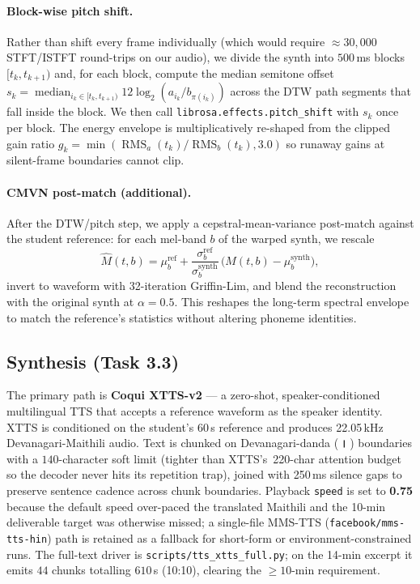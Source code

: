 \documentclass[conference]{IEEEtran}
\newcommand{\hin}[1]{{\hindifont #1}}
\begin{document}
\paragraph*{Block-wise pitch shift.} Rather than shift every frame
individually (which would require $\approx 30{,}000$ STFT/ISTFT
round-trips on our audio), we divide the synth into $500$\,ms blocks
$[t_k, t_{k+1})$ and, for each block, compute the median semitone
offset $s_k = \operatorname{median}_{i_k \in [t_k,t_{k+1})} 12\log_{2}(a_{i_k}/b_{\pi(i_k)})$
across the DTW path segments that fall inside the block. We then call
\texttt{librosa.effects.pitch\_shift} with $s_k$ once per block. The
energy envelope is multiplicatively re-shaped from the clipped gain
ratio $g_k = \min(\operatorname{RMS}_a(t_k)/\operatorname{RMS}_b(t_k), 3.0)$
so runaway gains at silent-frame boundaries cannot clip.

\paragraph*{CMVN post-match (additional).} After the DTW/pitch step, we
apply a cepstral-mean-variance post-match against the student reference:
for each mel-band $b$ of the warped synth, we rescale
\[
\hat{M}(t,b) = \mu^{\text{ref}}_b + \frac{\sigma^{\text{ref}}_b}{\sigma^{\text{synth}}_b}\,
    \big(M(t,b) - \mu^{\text{synth}}_b\big),
\]
invert to waveform with 32-iteration Griffin-Lim, and blend the
reconstruction with the original synth at $\alpha = 0.5$. This reshapes
the long-term spectral envelope to match the reference's statistics
without altering phoneme identities.

\subsection{Synthesis (Task 3.3)}
The primary path is \textbf{Coqui XTTS-v2} — a zero-shot, speaker-conditioned
multilingual TTS that accepts a reference waveform as the speaker identity.
XTTS is conditioned on the student's 60\,s reference and produces 22.05\,kHz
Devanagari-Maithili audio. Text is chunked on Devanagari-danda
($\,$\textbf{\hin{।}}$\,$) boundaries with a $140$-character soft limit
(tighter than XTTS's~220-char attention budget so the decoder never hits its
repetition trap), joined with 250\,ms silence gaps to preserve sentence
cadence across chunk boundaries. Playback \texttt{speed} is set to
\textbf{0.75} because the default speed over-paced the translated Maithili
and the 10-min deliverable target was otherwise missed; a single-file MMS-TTS
(\texttt{facebook/mms-tts-hin}) path is retained as a fallback for
short-form or environment-constrained runs. The full-text driver is
\texttt{scripts/tts\_xtts\_full.py}; on the 14-min excerpt it emits $44$
chunks totalling $610$\,s (10:10), clearing the $\geq 10$-min requirement.
\end{document}
